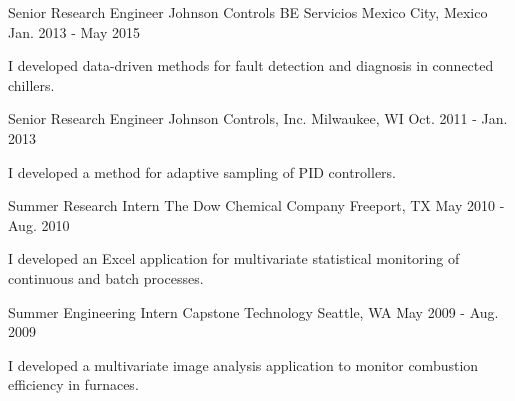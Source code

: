 \begin{cventries}
  \cventry
    {Senior Research Engineer} %
    {Johnson Controls BE Servicios} %
    {Mexico City, Mexico} %
    {Jan. 2013 - May 2015} %
    {
      \begin{cvitems} %
        \item {I developed data-driven methods for fault detection and diagnosis in connected chillers.}
      \end{cvitems}
    }

  \cventry
    {Senior Research Engineer} %
    {Johnson Controls, Inc.} %
    {Milwaukee, WI} %
    {Oct. 2011 - Jan. 2013} %
      {
      \begin{cvitems} %
        \item {I developed a method for adaptive sampling of PID controllers.}
      \end{cvitems}
    }

  \cventry
    {Summer Research Intern} %
    {The Dow Chemical Company} %
    {Freeport, TX} %
    {May 2010 - Aug. 2010} %
    {
      \begin{cvitems} %
        \item {I developed an Excel application for multivariate statistical monitoring of continuous and batch processes.}
      \end{cvitems}
    }

  \cventry
    {Summer Engineering Intern} %
    {Capstone Technology} %
    {Seattle, WA} %
    {May 2009 - Aug. 2009} %
    {
      \begin{cvitems} %
        \item {I developed a multivariate image analysis application to monitor combustion efficiency in furnaces.}
      \end{cvitems}
    }


\end{cventries}
